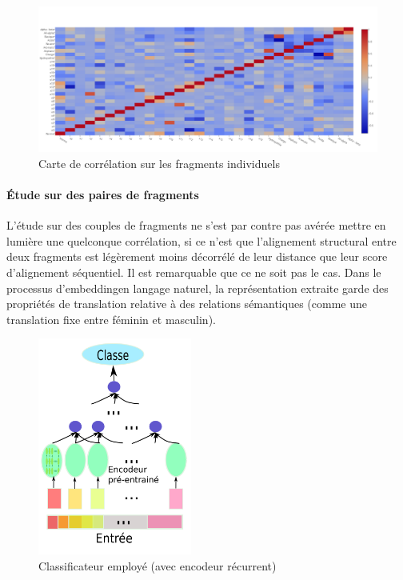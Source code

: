 \documentclass[a4paper, 11pt, onecolumn]{article}
\begin{document}
\begin{figure}
  \centering
  \includegraphics[scale=1.7]{SingleOneRecHeatf}
  \caption{Carte de corrélation sur les fragments individuels}
\end{figure}

\paragraph{Étude sur des paires de fragments}

L'étude sur des couples de fragments ne s'est par contre pas avérée mettre en lumière
une quelconque corrélation, si ce n'est que l'alignement structural entre deux
fragments est légèrement moins décorrélé de leur distance que leur score d'alignement
séquentiel. Il est remarquable que ce ne soit pas le cas. Dans le processus \og
d'embedding\fg en langage naturel, la représentation extraite garde des
propriétés de translation relative à des relations sémantiques (comme une
translation fixe entre féminin et masculin). 

\begin{figure}
  \includegraphics[width=0.45\textwidth]{Classd}
  \caption{Classificateur employé (avec encodeur récurrent)}
\end{figure}
\end{document}
